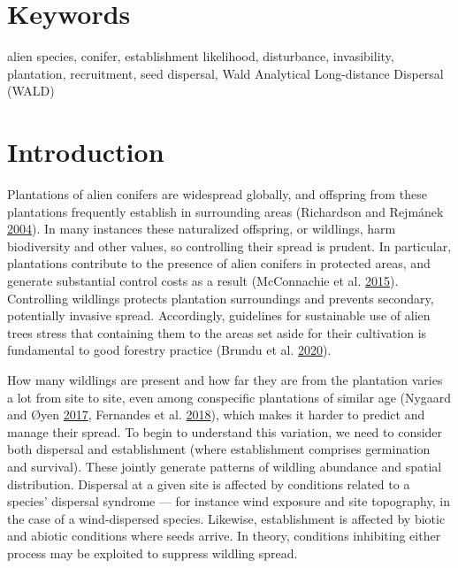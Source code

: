 \documentclass[
]{article}
\begin{document}
\hypertarget{keywords}{%
\section{Keywords}\label{keywords}}

alien species, conifer, establishment likelihood, disturbance, invasibility, plantation, recruitment, seed dispersal, Wald Analytical Long-distance Dispersal (WALD)

\hypertarget{introduction}{%
\section{Introduction}\label{introduction}}

Plantations of alien conifers are widespread globally, and offspring from these plantations frequently establish in surrounding areas (Richardson and Rejmánek \protect\hyperlink{ref-richardsonConifersInvasiveAliens2004}{2004}).
In many instances these naturalized offspring, or wildlings, harm biodiversity and other values, so controlling their spread is prudent.
In particular, plantations contribute to the presence of alien conifers in protected areas, and generate substantial control costs as a result (McConnachie et al. \protect\hyperlink{ref-mcconnachieEstimatingEffectPlantations2015}{2015}).
Controlling wildlings protects plantation surroundings and prevents secondary, potentially invasive spread.
Accordingly, guidelines for sustainable use of alien trees stress that containing them to the areas set aside for their cultivation is fundamental to good forestry practice (Brundu et al. \protect\hyperlink{ref-brunduGlobalGuidelinesSustainable2020}{2020}).

How many wildlings are present and how far they are from the plantation varies a lot from site to site, even among conspecific plantations of similar age (Nygaard and Øyen \protect\hyperlink{ref-nygaardSpreadIntroducedSitka2017}{2017}, Fernandes et al. \protect\hyperlink{ref-fernandesWhatDrivesEucalyptus2018}{2018}), which makes it harder to predict and manage their spread.
To begin to understand this variation, we need to consider both dispersal and establishment (where establishment comprises germination and survival).
These jointly generate patterns of wildling abundance and spatial distribution.
Dispersal at a given site is affected by conditions related to a species' dispersal syndrome --- for instance wind exposure and site topography, in the case of a wind-dispersed species.
Likewise, establishment is affected by biotic and abiotic conditions where seeds arrive.
In theory, conditions inhibiting either process may be exploited to suppress wildling spread.
\end{document}
